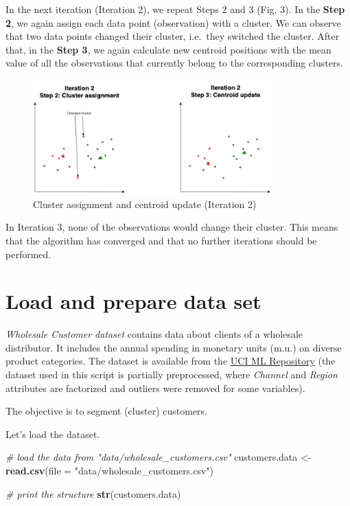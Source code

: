 \documentclass[]{article}
\newenvironment{Shaded}{\begin{snugshade}}{\end{snugshade}}
\newcommand{\KeywordTok}[1]{\textcolor[rgb]{0.13,0.29,0.53}{\textbf{#1}}}
\newcommand{\DataTypeTok}[1]{\textcolor[rgb]{0.13,0.29,0.53}{#1}}
\newcommand{\StringTok}[1]{\textcolor[rgb]{0.31,0.60,0.02}{#1}}
\newcommand{\CommentTok}[1]{\textcolor[rgb]{0.56,0.35,0.01}{\textit{#1}}}
\newcommand{\NormalTok}[1]{#1}
\begin{document}
In the next iteration (Iteration 2), we repeat Steps 2 and 3 (Fig. 3).
In the \textbf{Step 2}, we again assign each data point (observation)
with a cluster. We can observe that two data points changed their
cluster, i.e.~they switched the cluster. After that, in the \textbf{Step
3}, we again calculate new centroid positions with the mean value of all
the observations that currently belong to the corresponding clusters.

\begin{figure}[H]

{\centering \includegraphics[width=350px]{images/steps_2_3_iter2} 

}

\caption{Cluster assignment and centroid update (Iteration 2)}\label{fig:unnamed-chunk-4}
\end{figure}

In Iteration 3, none of the observations would change their cluster.
This means that the algorithm has converged and that no further
iterations should be performed.

\section{Load and prepare data set}\label{load-and-prepare-data-set}

\emph{Wholesale Customer dataset} contains data about clients of a
wholesale distributor. It includes the annual spending in monetary units
(m.u.) on diverse product categories. The dataset is available from the
\href{https://archive.ics.uci.edu/ml/datasets/Wholesale+customers}{UCI
ML Repository} (the dataset used in this script is partially
preprocessed, where \emph{Channel} and \emph{Region} attributes are
factorized and outliers were removed for some variables).

The objective is to segment (cluster) customers.

Let's load the dataset.

\begin{Shaded}
\begin{Highlighting}[]
\CommentTok{# load the data from "data/wholesale_customers.csv"}
\NormalTok{customers.data <-}\StringTok{ }\KeywordTok{read.csv}\NormalTok{(}\DataTypeTok{file =} \StringTok{"data/wholesale_customers.csv"}\NormalTok{)}

\CommentTok{# print the structure}
\KeywordTok{str}\NormalTok{(customers.data)}
\end{Highlighting}
\end{Shaded}
\end{document}
